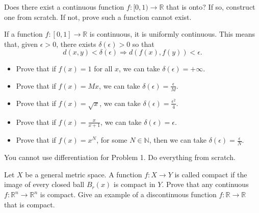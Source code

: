   \begin{exercise}
    Does there exist a continuous function $f : [0, 1) \to \mathbb{R}$ that is onto? If so, construct one from scratch. If not, prove such a function cannot exist.
  \end{exercise}
  \begin{solution}

  \end{solution}

  \begin{exercise}
    If a function $f : [0, 1] \to \mathbb{R}$ is continuous, it is uniformly continuous. This means that, given $\epsilon > 0$, there exists $\delta(\epsilon) > 0$ so that
    \begin{equation}
      d(x, y) < \delta(\epsilon) \Rightarrow d(f(x), f(y)) < \epsilon.
    \end{equation}
    \begin{itemize}
      \item Prove that if $f(x) = 1$ for all $x$, we can take $\delta(\epsilon) = +\infty$.
      \item Prove that if $f(x) = Mx$, we can take $\delta(\epsilon) = \frac{\epsilon}{M}$.
      \item Prove that if $f(x) = \sqrt{x}$, we can take $\delta(\epsilon) = \frac{\epsilon^2}{4}$.
      \item Prove that if $f(x) = \frac{x}{x+1}$, we can take $\delta(\epsilon) = \epsilon$.
      \item Prove that if $f(x) = x^N$, for some $N \in \mathbb{N}$, then we can take $\delta(\epsilon) = \frac{\epsilon}{N}$.
    \end{itemize}
    You cannot use differentiation for Problem 1. Do everything from scratch.
  \end{exercise}
  \begin{solution}

  \end{solution}

  \begin{exercise}
    Let $X$ be a general metric space. A function $f : X \to Y$ is called compact if the image of every closed ball $B_r(x)$ is compact in $Y$. Prove that any continuous $f : \mathbb{R}^n \to \mathbb{R}^n$ is compact. Give an example of a discontinuous function $f : \mathbb{R} \to \mathbb{R}$ that is compact.
  \end{exercise}
  \begin{solution}

  \end{solution}

